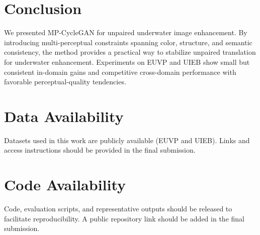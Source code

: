 \documentclass[11pt,a4paper]{article}
\begin{document}
\section{Conclusion}
We presented MP-CycleGAN for unpaired underwater image enhancement. By introducing multi-perceptual constraints spanning color, structure, and semantic consistency, the method provides a practical way to stabilize unpaired translation for underwater enhancement. Experiments on EUVP and UIEB show small but consistent in-domain gains and competitive cross-domain performance with favorable perceptual-quality tendencies.
\section*{Data Availability}
Datasets used in this work are publicly available (EUVP and UIEB). Links and access instructions should be provided in the final submission.
\section*{Code Availability}
Code, evaluation scripts, and representative outputs should be released to facilitate reproducibility. A public repository link should be added in the final submission.
\end{document}
